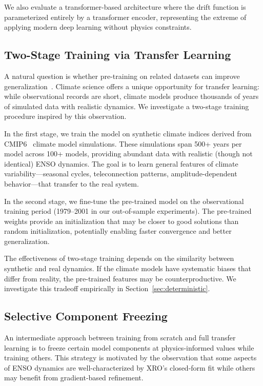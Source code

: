 We also evaluate a transformer-based architecture where the drift function is parameterized entirely by a transformer encoder, representing the extreme of applying modern deep learning without physics constraints.

\subsection{Two-Stage Training via Transfer Learning}

A natural question is whether pre-training on related datasets can improve generalization~\cite{pan2010transfer,weiss2016survey}. Climate science offers a unique opportunity for transfer learning: while observational records are short, climate models produce thousands of years of simulated data with realistic dynamics. We investigate a two-stage training procedure inspired by this observation.

In the first stage, we train the model on synthetic climate indices derived from CMIP6~\cite{eyring2016cmip6} climate model simulations. These simulations span 500+ years per model across 100+ models, providing abundant data with realistic (though not identical) ENSO dynamics. The goal is to learn general features of climate variability---seasonal cycles, teleconnection patterns, amplitude-dependent behavior---that transfer to the real system.

In the second stage, we fine-tune the pre-trained model on the observational training period (1979--2001 in our out-of-sample experiments). The pre-trained weights provide an initialization that may be closer to good solutions than random initialization, potentially enabling faster convergence and better generalization.

The effectiveness of two-stage training depends on the similarity between synthetic and real dynamics. If the climate models have systematic biases that differ from reality, the pre-trained features may be counterproductive. We investigate this tradeoff empirically in Section~\ref{sec:deterministic}.

\subsection{Selective Component Freezing}

An intermediate approach between training from scratch and full transfer learning is to freeze certain model components at physics-informed values while training others. This strategy is motivated by the observation that some aspects of ENSO dynamics are well-characterized by XRO's closed-form fit while others may benefit from gradient-based refinement.

